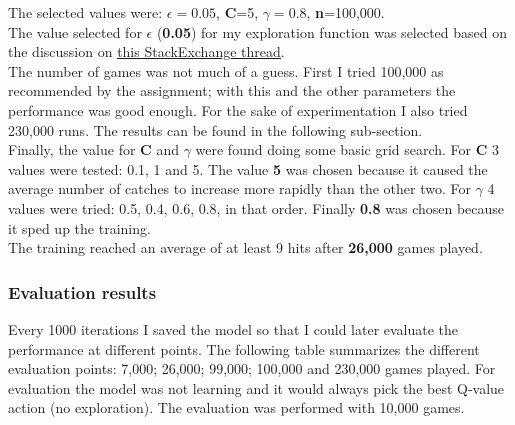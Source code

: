 \documentclass[11pt]{article}
\begin{document}
The selected values were: $\epsilon=0.05$, \textbf{C}=5, $\gamma=0.8$, \textbf{n}=100,000.\\

The value selected for $\epsilon$ (\textbf{0.05}) for my exploration function was selected based on the discussion on \href{https://stats.stackexchange.com/questions/270618/why-does-q-learning-use-epsilon-greedy-during-testing}{this StackExchange thread}.\\

The number of games was not much of a guess. First I tried 100,000 as recommended by the assignment; with this and the other parameters the performance was good enough. For the sake of experimentation I also tried 230,000 runs. The results can be found in the following sub-section.\\

Finally, the value for \textbf{C} and $\gamma$ were found doing some basic grid search. For \textbf{C} 3 values were tested: 0.1, 1 and 5. The value \textbf{5} was chosen because it caused the average number of catches to increase more rapidly than the other two. For $\gamma$ 4 values were tried: 0.5, 0.4, 0.6, 0.8, in that order. Finally \textbf{0.8} was chosen because it sped up the training.\\

The training reached an average of at least 9 hits after \textbf{26,000} games played.

\subsubsection*{Evaluation results}

Every 1000 iterations I saved the model so that I could later evaluate the performance at different points. The following table summarizes the different evaluation points: 7,000; 26,000; 99,000; 100,000 and 230,000 games played. For evaluation the model was not learning and it would always pick the best Q-value action (no exploration). The evaluation was performed with 10,000 games. 
\end{document}
